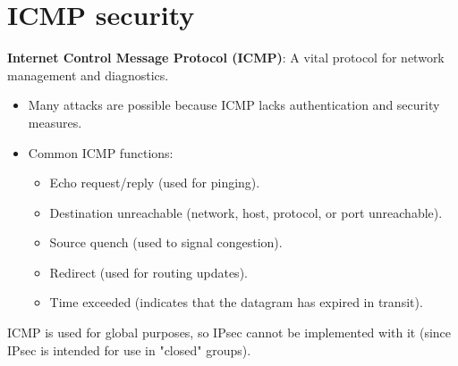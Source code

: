 \section{ICMP security}
\textbf{Internet Control Message Protocol (ICMP)}: A vital protocol for network management and diagnostics.
\begin{itemize}
    \item Many attacks are possible because ICMP lacks authentication and security measures.
    \item Common ICMP functions:
    \begin{itemize}
        \item Echo request/reply (used for pinging).
        \item Destination unreachable (network, host, protocol, or port unreachable).
        \item Source quench (used to signal congestion).
        \item Redirect (used for routing updates).
        \item Time exceeded (indicates that the datagram has expired in transit).
    \end{itemize}
\end{itemize}

\begin{tcolorbox}[colback=blue!10!white, colframe=blue!50!white, title=ICMP and IPsec]
ICMP is used for global purposes, so IPsec cannot be implemented with it (since IPsec is intended for use in "closed" groups).
\end{tcolorbox}
